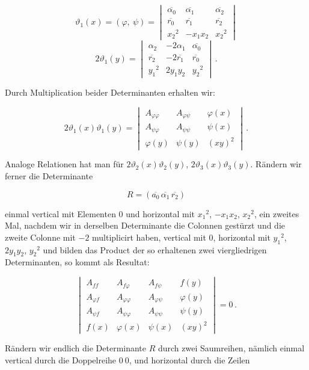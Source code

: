 \documentclass[11pt]{article}
\begin{document}
\[
\vartheta_1(x) = (\varphi,\ \psi) =
\begin{vmatrix}
\overline{\alpha_0} & \overline{\alpha_1} & \overline{\alpha_2} \\
\overline{r_0} & \overline{r_1} & \overline{r_2} \\
x_2{}^2 & -x_1x_2 & x_2{}^2
\end{vmatrix}
\]
\[
2\vartheta_1(y) =
\begin{vmatrix}
\alpha_2 & -2\alpha_1 & \overline{\alpha_0} \\
\overline{r_2} & -2\overline{r_1} & \overline{r_0} \\
y_1{}^2 & 2y_1y_2 & y_2{}^2
\end{vmatrix}\,.
\]

Durch Multiplication beider Determinanten erhalten wir:

\[
2\vartheta_1(x)\vartheta_1(y) =
\begin{vmatrix}
A_{\varphi\varphi} & A_{\varphi\psi} & \varphi(x) \\
A_{\psi\varphi} & A_{\psi\psi} & \psi(x) \\
\varphi(y) & \psi(y) & (xy)^2
\end{vmatrix}\,. \tag{V}
\]

Analoge Relationen hat man f\"ur $2\vartheta_2(x)\vartheta_2(y)$, $2\vartheta_3(x)\vartheta_3(y)$. R\"andern wir ferner die Determinante

\[
R = (\overline{a_0}\,\overline{\alpha_1}\,\overline{r_2})
\]

einmal vertical mit Elementen $0$ und horizontal mit $x_1{}^2$, $-x_1x_2$, $x_2{}^2$, ein zweites Mal, nachdem wir in derselben Determinante die Colonnen gest\"urzt und die zweite Colonne mit $-2$ multiplicirt haben, vertical mit $0$, horizontal mit $y_1{}^2$, $2y_1y_2$, $y_2{}^2$ und bilden das Product der so erhaltenen zwei viergliedrigen Determinanten, so kommt als Resultat:

\[
\begin{vmatrix}
A_{ff} & A_{f\varphi} & A_{f\psi} & f(y) \\
A_{\varphi f} & A_{\varphi\varphi} & A_{\varphi\psi} & \varphi(y) \\
A_{\psi f} & A_{\psi\varphi} & A_{\psi\psi} & \psi(y) \\
f(x) & \varphi(x) & \psi(x) & (xy)^2
\end{vmatrix} = 0\,. \tag{VI}
\]

R\"andern wir endlich die Determinante $R$ durch zwei Saumreihen, n\"amlich einmal vertical durch die Doppelreihe $0\ 0$, und horizontal durch die Zeilen
\end{document}
